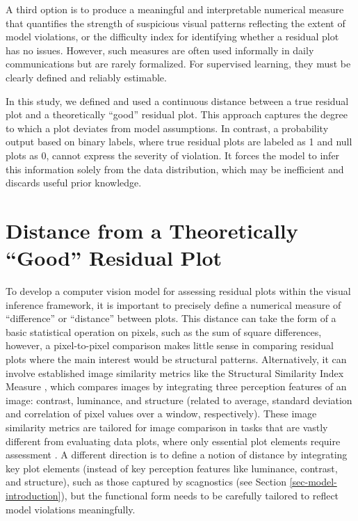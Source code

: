 \documentclass[]{interact}
\theoremstyle{plain}%
\theoremstyle{definition}
\theoremstyle{remark}
\begin{document}
A third option is to produce a meaningful and interpretable numerical
measure that quantifies the strength of suspicious visual patterns
reflecting the extent of model violations, or the difficulty index for
identifying whether a residual plot has no issues. However, such
measures are often used informally in daily communications but are
rarely formalized. For supervised learning, they must be clearly defined
and reliably estimable.

In this study, we defined and used a continuous distance between a true
residual plot and a theoretically ``good'' residual plot. This approach
captures the degree to which a plot deviates from model assumptions. In
contrast, a probability output based on binary labels, where true
residual plots are labeled as 1 and null plots as 0, cannot express the
severity of violation. It forces the model to infer this information
solely from the data distribution, which may be inefficient and discards
useful prior knowledge.

\section{Distance from a Theoretically ``Good'' Residual
Plot}\label{sec-model-distance-between-residual-plots}

To develop a computer vision model for assessing residual plots within
the visual inference framework, it is important to precisely define a
numerical measure of ``difference'' or ``distance'' between plots. This
distance can take the form of a basic statistical operation on pixels,
such as the sum of square differences, however, a pixel-to-pixel
comparison makes little sense in comparing residual plots where the main
interest would be structural patterns. Alternatively, it can involve
established image similarity metrics like the Structural Similarity
Index Measure \citep{wang2004image}, which compares images by
integrating three perception features of an image: contrast, luminance,
and structure (related to average, standard deviation and correlation of
pixel values over a window, respectively). These image similarity
metrics are tailored for image comparison in tasks that are vastly
different from evaluating data plots, where only essential plot elements
require assessment \citep{chowdhury2018measuring}. A different direction
is to define a notion of distance by integrating key plot elements
(instead of key perception features like luminance, contrast, and
structure), such as those captured by scagnostics (see Section
\ref{sec-model-introduction}), but the functional form needs to be
carefully tailored to reflect model violations meaningfully.
\end{document}

